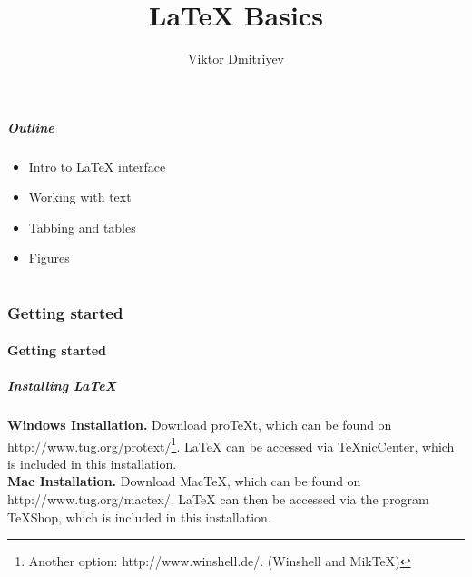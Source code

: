 \documentclass[slidestop,compress,mathserif]{beamer}
\title{LaTeX Basics}
\subtitle{}
\author{Viktor Dmitriyev}
\institute{Adapted from Mini Course on LaTeX by \href{https://github.com/OpenIntroOrg/mini-course-materials}{David Diez}}
\date{}
\begin{document}
\newenvironment{act}[1]{{\color{command}#1}}{}


\frame{ \titlepage }

\begin{frame}
  \frametitle{Outline}
  \begin{itemize}
  \item Intro to LaTeX interface
  \item Working with text
  \item Tabbing and tables
  \item Figures
  \end{itemize}
\end{frame}

\part{}

\section[Getting started]{Getting started}
\subsection[Getting started]{Getting started}

\begin{frame} \frametitle{Installing LaTeX}
	
	{\bf Windows Installation. } Download proTeXt, which can be found on {\color{highlight}http://www.tug.org/protext/}\footnote{Another option: {\color{highlight}http://www.winshell.de/}. (Winshell and MikTeX)}. LaTeX can be accessed via TeXnicCenter, which is included in this installation. \\
	
	{\bf Mac Installation. } Download MacTeX, which can be found on {\color{highlight}http://www.tug.org/mactex/}. LaTeX can then be accessed via the program TeXShop, which is included in this installation. \\
	\vspace{0.5cm}

\end{frame}
\end{document}
